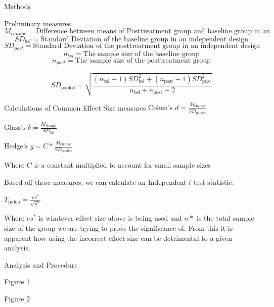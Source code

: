 \documentclass[
  ignorenonframetext,
  aspectratio=169,
]{beamer}
\begin{document}
\begin{frame}{Methods}
\protect\hypertarget{methods}{}
\begin{block}{Preliminary measures}
\protect\hypertarget{preliminary-measures}{}
\[
M_{change}=\text{Difference between means of Posttreatment group and baseline group in an independent design }
\] \[
SD_{bsl}={\text{Standard Deviation of the baseline group in an independent design}}
\] \[
SD_{post}={\text{Standard Deviation of the posttreatment group in an independent design}}
\] \[
n_{bsl}= \text{The sample size of the baseline group}
\] \[
n_{post}= \text{The sample size of the posttreatment group}
\]

\[
SD_\text{pooled}=\sqrt{\frac{(n_{\text{bsl}}-1)SD_{\text{bsl}}^2+(n_{\text{post}}-1)SD^2_{\text{post}}}{
n_{\text{bsl}}+n_{\text{post}}-2}}
\]
\end{block}
\end{frame}

\begin{frame}{Calculations of Common Effect Size measures}
\protect\hypertarget{calculations-of-common-effect-size-measures}{}
\(\text{Cohen's } d= \frac{M_\text{change}}{SD_\text{pooled}}\)

\(\text{Glass's } \delta = \frac{M_\text{change}}{SD_{\text{bsl}}}\)

\(\text{Hedge's }g= C*\frac{M_\text{change}}{SD_\text{pooled}}\)

Where \(C\) is a constant multiplied to account for small sample sizes

Based off these measures, we can calculate an Independent \(t\) test
statistic:

\(T_\text{indep}=\frac{es^*}{\sqrt{n^*}}\)

Where \(es^*\) is whatever effect size above is being used and \(n*\) is
the total sample size of the group we are trying to prove the
significance of. From this it is apparent how using the incorrect effect
size can be detrimental to a given analysis.
\end{frame}

\begin{frame}{Analysis and Procedure}
\protect\hypertarget{analysis-and-procedure}{}
\end{frame}

\begin{frame}{Figure 1}
\protect\hypertarget{figure-1}{}
\end{frame}

\begin{frame}{Figure 2}
\protect\hypertarget{figure-2}{}
\end{frame}
\end{document}
